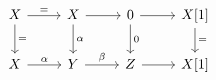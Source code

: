 \documentclass[12pt]{standalone}
\begin{document}
        $$

\begin{tikzcd}
X \arrow[r,"="] \arrow[d,"="] & X \arrow[r] \arrow[d,"\alpha"] & 0 \arrow[r] \arrow[d,"0"] & X[1] \arrow[d,"="] \\
X \arrow[r,"\alpha"] & Y \arrow[r,"\beta"] & Z \arrow[r] & X[1] 
\end{tikzcd}
        $$
        
\end{document}
